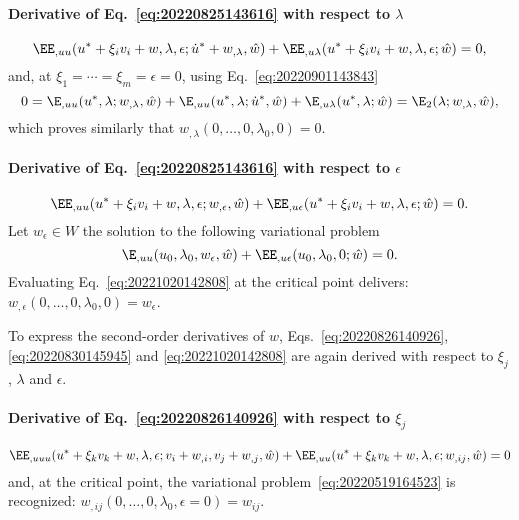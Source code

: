 \paragraph{Derivative of Eq.~\eqref{eq:20220825143616} with respect to $\lambda$}
\begin{equation}
  \label{eq:20220830145945}
  \EE_{,uu}(u^\ast + \xi_i v_i + w, \lambda, \epsilon; \dot{u}^\ast + w_{,\lambda}, \hat{w}) + \EE_{,u\lambda}(u^\ast + \xi_i v_i + w, \lambda, \epsilon; \hat{w}) = 0,
\end{equation}
and, at \(\xi_1 = \cdots = \xi_m = \epsilon = 0\), using Eq.~\eqref{eq:20220901143843}
\begin{equation}
  \label{eq:20220830151513}
  0 = \E_{,uu}(u^\ast, \lambda; w_{,\lambda}, \hat{w})
  + \E_{,uu}(u^\ast, \lambda; \dot{u}^\ast, \hat{w}) + \E_{,u\lambda}(u^\ast, \lambda; \hat{w})
  = \E_2(\lambda; w_{,\lambda}, \hat{w}),
\end{equation}
which proves similarly that \(w_{,\lambda}(0, \ldots, 0, \lambda_0, 0) = 0\).

\paragraph{Derivative of Eq.~\eqref{eq:20220825143616} with respect to $\epsilon$}
\begin{equation}
  \label{eq:20221020142808}
  \EE_{,uu}(u^\ast + \xi_i v_i + w, \lambda, \epsilon; w_{,\epsilon}, \hat{w}) + \EE_{,u\epsilon}(u^\ast + \xi_i v_i + w, \lambda, \epsilon; \hat{w}) = 0.
\end{equation}
Let \(w_\epsilon \in W\) the solution to the following variational problem
\begin{equation}
    \label{eq:20221030175016}
    \E_{,uu}(u_0, \lambda_0, w_\epsilon, \hat{w}) + \EE_{,u\epsilon}(u_0, \lambda_0, 0; \hat{w}) = 0.
\end{equation}
Evaluating Eq.~\eqref{eq:20221020142808} at the critical point delivers: \(w_{,\epsilon}(0, \ldots, 0, \lambda_0, 0) = w_\epsilon\).

\bigskip

To express the second-order derivatives of $w$, Eqs.~\eqref{eq:20220826140926}, \eqref{eq:20220830145945} and
\eqref{eq:20221020142808} are again derived with respect to $\xi_j$, $\lambda$ and \(\epsilon\).

\bigskip

\paragraph{Derivative of Eq.~\eqref{eq:20220826140926} with respect to \(\xi_j\)}
\begin{equation}
  \EE_{,uuu}(u^\ast + \xi_k v_k + w, \lambda, \epsilon; v_i + w_{,i}, v_j + w_{,j}, \hat{w}) + \EE_{,uu}(u^\ast + \xi_k v_k + w, \lambda, \epsilon; w_{,ij}, \hat{w}) = 0
\end{equation}
and, at the critical point, the variational problem~\eqref{eq:20220519164523} is recognized:
\(w_{,ij}(0, \ldots, 0, \lambda_0, \epsilon = 0) = w_{ij}\).

